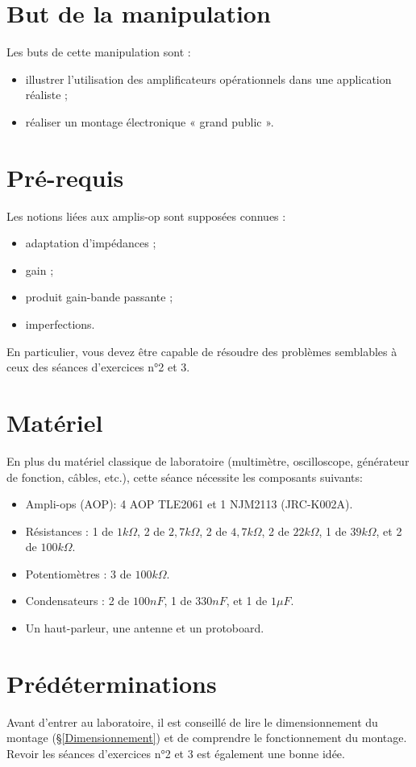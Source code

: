 \documentclass{../template/labo}
\author{The Fantastic Four}
\begin{document}

\section{But de la manipulation}

Les buts de cette manipulation sont :
\begin{itemize}
	\item illustrer l'utilisation des amplificateurs opérationnels dans une application réaliste ;
	\item réaliser un montage électronique « grand public ».
\end{itemize}

\section{Pré-requis}
Les notions liées aux amplis-op sont supposées connues :
\begin{itemize}
\item adaptation d'impédances ;
\item gain ;
\item produit gain-bande passante ;
\item imperfections.
\end{itemize}
En particulier, vous devez être capable de résoudre des problèmes semblables à ceux des séances d'exercices n°2 et 3.

\section{Matériel}
En plus du matériel classique de laboratoire (multimètre, oscilloscope, générateur de fonction, câbles, etc.), cette séance nécessite les composants suivants: 
\begin{itemize}
\item Ampli-ops (AOP): 4 AOP TLE2061 et 1 NJM2113 (JRC-K002A).
\item Résistances : 1 de $1k\Omega$, 2 de $2,7k\Omega$, 2 de $4,7k\Omega$, 2 de $22k\Omega$, 1 de $39k\Omega$, et 2 de $100k\Omega$.
\item Potentiomètres : 3 de $100k\Omega$.
\item Condensateurs : 2 de $100nF$, 1 de $330nF$, et 1 de $1\mu F$.
\item Un haut-parleur, une antenne et un protoboard.
\end{itemize}

\newpage
\section{Prédéterminations} %
Avant d'entrer au laboratoire, il est conseillé de lire le dimensionnement du montage (§\ref{Dimensionnement}) et de comprendre le
fonctionnement du montage. Revoir les séances d'exercices n°2 et 3 est également une bonne idée.
\end{document}
